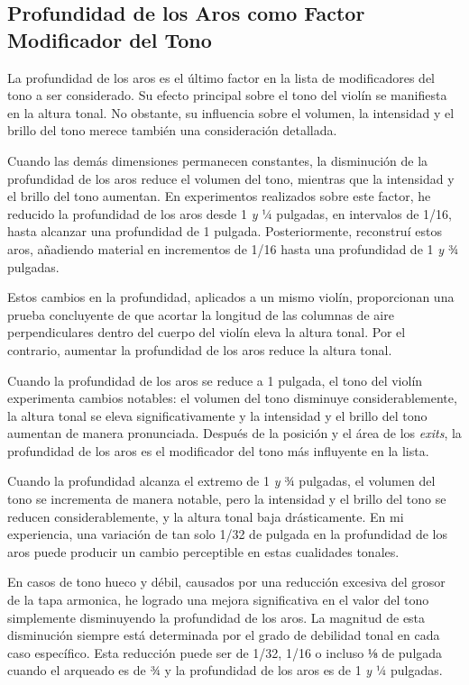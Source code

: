 \documentclass[12pt]{book}
\begin{document}
\subsection*{Profundidad de los Aros como Factor Modificador del Tono}

La profundidad de los aros es el último factor en la lista de modificadores del tono a ser considerado. Su efecto principal sobre el tono del violín se manifiesta en la altura tonal. No obstante, su influencia sobre el volumen, la intensidad y el brillo del tono merece también una consideración detallada.

Cuando las demás dimensiones permanecen constantes, la disminución de la profundidad de los aros reduce el volumen del tono, mientras que la intensidad y el brillo del tono aumentan. En experimentos realizados sobre este factor, he reducido la profundidad de los aros desde 1 \textit{y} ¼ pulgadas, en intervalos de 1/16, hasta alcanzar una profundidad de 1 pulgada. Posteriormente, reconstruí estos aros, añadiendo material en incrementos de 1/16 hasta una profundidad de 1 \textit{y} ¾ pulgadas.

Estos cambios en la profundidad, aplicados a un mismo violín, proporcionan una prueba concluyente de que acortar la longitud de las columnas de aire perpendiculares dentro del cuerpo del violín eleva la altura tonal. Por el contrario, aumentar la profundidad de los aros reduce la altura tonal.

Cuando la profundidad de los aros se reduce a 1 pulgada, el tono del violín experimenta cambios notables: el volumen del tono disminuye considerablemente, la altura tonal se eleva significativamente y la intensidad y el brillo del tono aumentan de manera pronunciada. Después de la posición y el área de los \textit{exits}, la profundidad de los aros es el modificador del tono más influyente en la lista.

Cuando la profundidad alcanza el extremo de 1 \textit{y} ¾ pulgadas, el volumen del tono se incrementa de manera notable, pero la intensidad y el brillo del tono se reducen considerablemente, y la altura tonal baja drásticamente. En mi experiencia, una variación de tan solo 1/32 de pulgada en la profundidad de los aros puede producir un cambio perceptible en estas cualidades tonales.

En casos de tono hueco y débil, causados por una reducción excesiva del grosor de la tapa armonica, he logrado una mejora significativa en el valor del tono simplemente disminuyendo la profundidad de los aros. La magnitud de esta disminución siempre está determinada por el grado de debilidad tonal en cada caso específico. Esta reducción puede ser de 1/32, 1/16 o incluso ⅛ de pulgada cuando el arqueado es de ¾ y la profundidad de los aros es de 1 \textit{y} ¼ pulgadas. 
\end{document}
